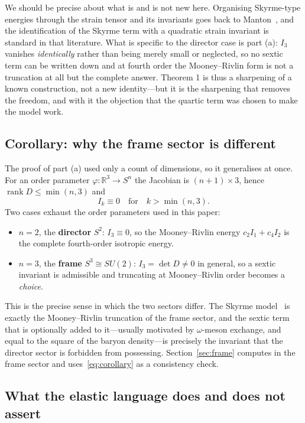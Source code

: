 \documentclass[aps,prd,preprint,nofootinbib,longbibliography]{revtex4-2}
\begin{document}
We should be precise about what is and is not new here. Organising Skyrme-type
energies through the strain tensor and its invariants goes back to
Manton~\cite{manton1987}, and the identification of the Skyrme term with a
quadratic strain invariant is standard in that literature. What is specific to
the director case is part (a): $I_3$ vanishes \emph{identically} rather than
being merely small or neglected, so no sextic term can be written down and at
fourth order the Mooney--Rivlin form is not a truncation at all but the complete
answer. Theorem 1
is thus a sharpening of a known construction, not a new identity---but it is the
sharpening that removes the freedom, and with it the objection that the quartic
term was chosen to make the model work.

\subsection{Corollary: why the frame sector is different}
\label{sec:corollary}

The proof of part (a) used only a count of dimensions, so it generalises at once.
For an order parameter $\varphi:\mathbb{R}^3\to S^n$ the Jacobian is
$(n+1)\times3$, hence $\operatorname{rank}D\le\min(n,3)$ and
\begin{equation}
I_k \equiv 0 \quad\text{for}\quad k>\min(n,3).
\label{eq:corollary}
\end{equation}
Two cases exhaust the order parameters used in this paper:
\begin{itemize}
\item $n=2$, the \textbf{director} $S^2$: $I_3\equiv0$, so the Mooney--Rivlin
energy $c_2I_1+c_4I_2$ is the complete fourth-order isotropic energy.
\item $n=3$, the \textbf{frame} $S^3\cong SU(2)$: $I_3=\det D\neq0$ in general, so
a sextic invariant is admissible and truncating at Mooney--Rivlin order becomes a
\emph{choice}.
\end{itemize}
This is the precise sense in which the two sectors differ. The Skyrme
model~\cite{skyrme1961} is exactly the Mooney--Rivlin truncation of the frame
sector, and the sextic term that is optionally added to it---usually motivated by
$\omega$-meson exchange, and equal to the square of the baryon density---is
precisely the invariant that the director sector is forbidden from possessing.
Section~\ref{sec:frame} computes in the frame sector and uses~\eqref{eq:corollary}
as a consistency check.

\subsection{What the elastic language does and does not assert}
\label{sec:language}
\end{document}
